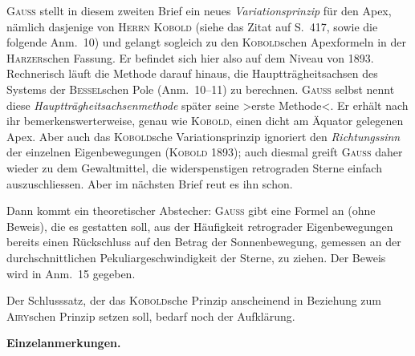 \documentclass[12pt,a4paper]{article}
\theoremstyle{plain}
\theoremstyle{definition}
\theoremstyle{remark}
\begin{document}
\begin{small}
\textsc{Gauss} stellt in diesem zweiten Brief ein neues \textit{Variationsprinzip} f\"ur den
Apex, n\"amlich dasjenige von \textsc{Herrn Kobold} (siehe das Zitat auf S.~417,
sowie die folgende Anm.~10) und gelangt sogleich zu den \textsc{Kobold}schen Apexformeln
in der \textsc{Harzer}schen Fassung. Er befindet sich hier also auf dem Niveau von
1893. Rechnerisch l\"auft die Methode darauf hinaus, die Haupttr\"agheitsachsen
des Systems der \textsc{Bessel}schen Pole (Anm.~10--11) zu berechnen. \textsc{Gauss} selbst
nennt diese \textit{Haupttr\"agheitsachsenmethode} sp\"ater seine \textgreater{}erste Methode\textless{}.
Er erh\"alt nach ihr bemerkenswerterweise, genau wie \textsc{Kobold}, einen dicht
am \"Aquator gelegenen Apex. Aber auch das \textsc{Kobold}sche Variationsprinzip
ignoriert den \textit{Richtungssinn} der einzelnen Eigenbewegungen (\textsc{Kobold} 1893);
auch diesmal greift \textsc{Gauss} daher wieder zu dem Gewaltmittel, die widerspenstigen
retrograden Sterne einfach auszuschliessen. Aber im n\"achsten Brief reut es ihn
schon.

Dann kommt ein theoretischer Abstecher: \textsc{Gauss} gibt eine Formel an (ohne
Beweis), die es gestatten soll, aus der H\"aufigkeit retrograder Eigenbewegungen
bereits einen R\"uckschluss auf den Betrag der Sonnenbewegung, gemessen an der
durchschnittlichen Pekuliargeschwindigkeit der Sterne, zu ziehen. Der Beweis wird
in Anm.~15 gegeben.

Der Schlusssatz, der das \textsc{Kobold}sche Prinzip anscheinend in Beziehung zum
\textsc{Airy}schen Prinzip setzen soll, bedarf noch der Aufkl\"arung.

\textbf{Einzelanmerkungen.}


\end{small}
\end{document}
